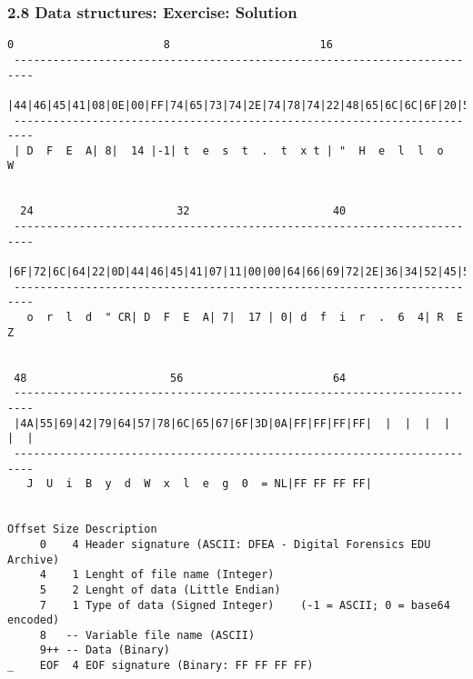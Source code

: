 \begin{frame}[fragile]
	\frametitle{2.8 Data structures: Exercise: Solution}
\begin{lstlisting}[basicstyle=\tiny]
  0                       8                       16                      
 ------------------------------------------------------------------------- 
 |44|46|45|41|08|0E|00|FF|74|65|73|74|2E|74|78|74|22|48|65|6C|6C|6F|20|57|
 -------------------------------------------------------------------------
 | D  F  E  A| 8|  14 |-1| t  e  s  t  .  t  x t | "  H  e  l  l  o     W


  24                      32                      40
 -------------------------------------------------------------------------
 |6F|72|6C|64|22|0D|44|46|45|41|07|11|00|00|64|66|69|72|2E|36|34|52|45|5A|
 -------------------------------------------------------------------------
   o  r  l  d  " CR| D  F  E  A| 7|  17 | 0| d  f  i  r  .  6  4| R  E  Z


 48                      56                       64
 -------------------------------------------------------------------------
 |4A|55|69|42|79|64|57|78|6C|65|67|6F|3D|0A|FF|FF|FF|FF|  |  |  |  |  |  |
 -------------------------------------------------------------------------
   J  U  i  B  y  d  W  x  l  e  g  0  = NL|FF FF FF FF|


Offset Size Description
     0    4 Header signature (ASCII: DFEA - Digital Forensics EDU Archive)
     4    1 Lenght of file name (Integer)
     5    2 Lenght of data (Little Endian)
     7    1 Type of data (Signed Integer)    (-1 = ASCII; 0 = base64 encoded)
     8   -- Variable file name (ASCII)
     9++ -- Data (Binary)
_    EOF  4 EOF signature (Binary: FF FF FF FF)
\end{lstlisting}
\end{frame}


